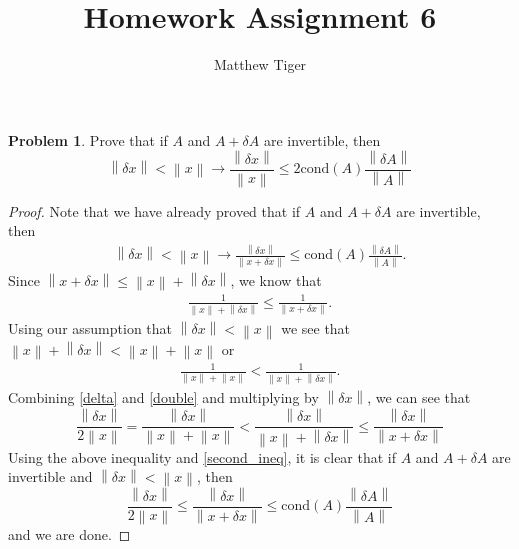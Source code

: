 \documentclass[12pt]{article}
\title{Homework Assignment 6}
\author{Matthew Tiger}
\theoremstyle{definition}
\newtheorem{problem}{Problem}
\newcommand{\norm}[1]{\left\lVert#1\right\rVert}
\begin{document}
\maketitle


\begin{problem}
  Prove that if $A$ and $A + \delta A$ are invertible, then
  \[
    \norm{\delta x} < \norm{x} \to \frac{\norm{\delta x}}{\norm{x}} \leq
    2 \text{cond}(A) \frac{\norm{\delta A}}{\norm{A}}
  \]
\end{problem}

\begin{proof}
  Note that we have already proved that if $A$ and $A + \delta A$ are invertible, then
  \begin{align}\label{second_ineq}
    \norm{\delta x} < \norm{x} \to \frac{\norm{\delta x}}{\norm{x + \delta x}} \leq
    \text{cond}(A) \frac{\norm{\delta A}}{\norm{A}}.
  \end{align}
  Since $\norm{x + \delta x} \leq \norm{x} + \norm{\delta x}$, we know that
  \begin{align}\label{delta}
    \frac{1}{\norm{x} + \norm{\delta x}} \leq \frac{1}{\norm{x + \delta x}}.
  \end{align}
  Using our assumption that $\norm{\delta x} < \norm{x}$ we see that
  $\norm{x} + \norm{\delta x} < \norm{x} + \norm{x}$ or
  \begin{align}\label{double}
    \frac{1}{\norm{x} + \norm{x}} < \frac{1}{\norm{x} + \norm{\delta x}}.
  \end{align}
  Combining \eqref{delta} and \eqref{double} and multiplying by $\norm{\delta x}$, we can see that
  \[
    \frac{\norm{\delta x}}{2\norm{x}} = \frac{\norm{\delta x}}{\norm{x} + \norm{x}} < \frac{\norm{\delta x}}{\norm{x} + \norm{\delta x}} \leq \frac{\norm{\delta x}}{\norm{x + \delta x}}
  \]
  Using the above inequality and \eqref{second_ineq}, it is clear that if
  $A$ and $A + \delta A$ are invertible and $\norm{\delta x} < \norm{x}$, then
  \[
    \frac{\norm{\delta x}}{2\norm{x}} \leq \frac{\norm{\delta x}}{\norm{x + \delta x}} \leq     \text{cond}(A) \frac{\norm{\delta A}}{\norm{A}}
  \]
  and we are done.
\end{proof}
\end{document}
